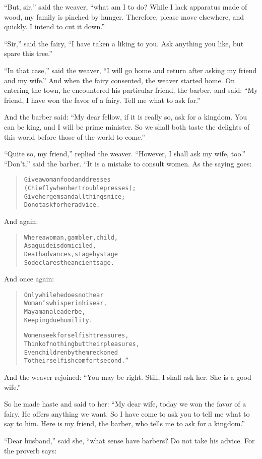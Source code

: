 \documentclass[article, twoside, 14pt]{memoir}
\renewenvironment{verbatim}{%
\begin{quote}%
\vskip -10pt%
\begin{alltt}\normalfont\large}{\end{alltt}%
\end{quote}%
\vskip -10pt
} %
\begin{document}
``But, sir,'' said the weaver,
``what am I to do? While I lack apparatus made of wood, my family is pinched by hunger. Therefore, please move elsewhere, and quickly. I intend to cut it down.''

``Sir,'' said the fairy,
``I have taken a liking to you. Ask anything you like, but spare this tree.''

``In that case,'' said the weaver,
``I will go home and return after asking my friend and my wife.''
And when the fairy consented, the weaver started home. On entering
the town, he encountered his particular friend, the barber, and
said:
``My friend, I have won the favor of a fairy. Tell me what to ask for.''

And the barber said:
``My dear fellow, if it is really so, ask for a kingdom. You can be king, and I will be prime minister. So we shall both taste the delights of this world before those of the world to come.''

``Quite so, my friend,'' replied the weaver.
``However, I shall ask my wife, too.'' ``Don't,'' said the barber.
“It is a mistake to consult women. As the saying goes:

\begin{verbatim}
Give a woman food and dresses
(Chiefly when her trouble presses);
Give her gems and all things nice;
Do not ask for her advice.
\end{verbatim}
And again:

\begin{verbatim}
Where a woman, gambler, child,
As a guide is domiciled,
Death advances, stage by stage{\textemdash}
So declares the ancient sage.
\end{verbatim}
And once again:

\begin{verbatim}
Only while he does not hear
Woman's whisper in his ear,
May a man a leader be,
Keeping due humility.

Women seek for selfish treasures,
Think of nothing but their pleasures,
Even children by them reckoned
To their selfish comfort second.”
\end{verbatim}
And the weaver rejoined:
``You may be right. Still, I shall ask her. She is a good wife.''

So he made haste and said to her:
``My dear wife, today we won the favor of a fairy. He offers anything we want. So I have come to ask you to tell me what to say to him. Here is my friend, the barber, who tells me to ask for a kingdom.''

``Dear husband,'' said she, “what sense have barbers? Do not take
his advice. For the proverb says:
\end{document}
